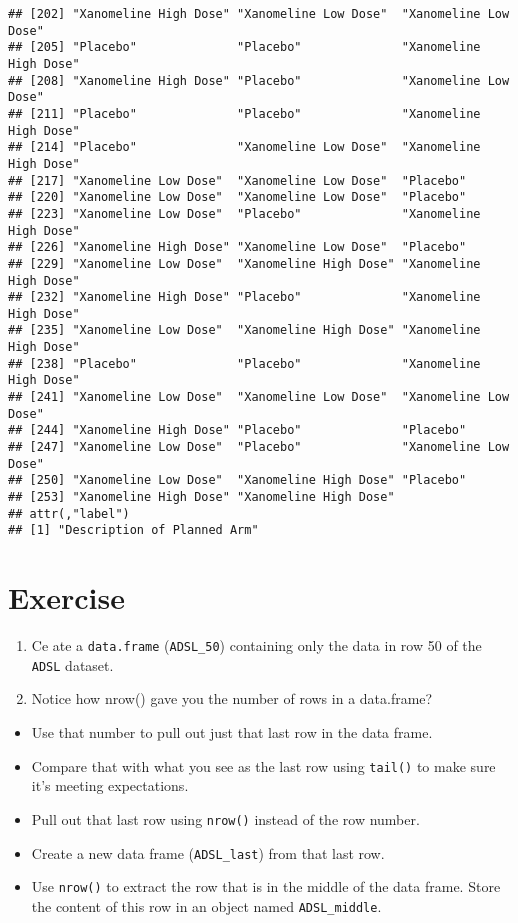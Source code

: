 \documentclass[]{book}
\providecommand{\tightlist}{%
  \setlength{\itemsep}{0pt}\setlength{\parskip}{0pt}}
\begin{document}
\begin{verbatim}
## [202] "Xanomeline High Dose" "Xanomeline Low Dose"  "Xanomeline Low Dose" 
## [205] "Placebo"              "Placebo"              "Xanomeline High Dose"
## [208] "Xanomeline High Dose" "Placebo"              "Xanomeline Low Dose" 
## [211] "Placebo"              "Placebo"              "Xanomeline High Dose"
## [214] "Placebo"              "Xanomeline Low Dose"  "Xanomeline High Dose"
## [217] "Xanomeline Low Dose"  "Xanomeline Low Dose"  "Placebo"             
## [220] "Xanomeline Low Dose"  "Xanomeline Low Dose"  "Placebo"             
## [223] "Xanomeline Low Dose"  "Placebo"              "Xanomeline High Dose"
## [226] "Xanomeline High Dose" "Xanomeline Low Dose"  "Placebo"             
## [229] "Xanomeline Low Dose"  "Xanomeline High Dose" "Xanomeline High Dose"
## [232] "Xanomeline High Dose" "Placebo"              "Xanomeline High Dose"
## [235] "Xanomeline Low Dose"  "Xanomeline High Dose" "Xanomeline High Dose"
## [238] "Placebo"              "Placebo"              "Xanomeline High Dose"
## [241] "Xanomeline Low Dose"  "Xanomeline Low Dose"  "Xanomeline Low Dose" 
## [244] "Xanomeline High Dose" "Placebo"              "Placebo"             
## [247] "Xanomeline Low Dose"  "Placebo"              "Xanomeline Low Dose" 
## [250] "Xanomeline Low Dose"  "Xanomeline High Dose" "Placebo"             
## [253] "Xanomeline High Dose" "Xanomeline High Dose"
## attr(,"label")
## [1] "Description of Planned Arm"
\end{verbatim}

\hypertarget{exercise-2}{%
\section{Exercise}\label{exercise-2}}

\begin{enumerate}
\def\labelenumi{\arabic{enumi}.}
\item
  Ce ate a \texttt{data.frame} (\texttt{ADSL\_50}) containing only the data in row 50 of the \texttt{ADSL} dataset.
\item
  Notice how nrow() gave you the number of rows in a data.frame?
\end{enumerate}

\begin{itemize}
\tightlist
\item
  Use that number to pull out just that last row in the data frame.
\item
  Compare that with what you see as the last row using \texttt{tail()} to make sure it's meeting expectations.
\item
  Pull out that last row using \texttt{nrow()} instead of the row number.
\item
  Create a new data frame (\texttt{ADSL\_last}) from that last row.
\item
  Use \texttt{nrow()} to extract the row that is in the middle of the data frame. Store the content of this row in an object named \texttt{ADSL\_middle}.
\end{itemize}
\end{document}
